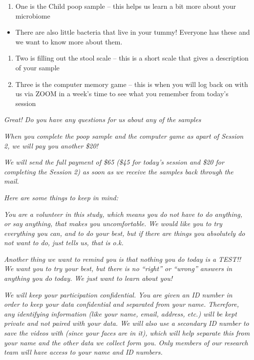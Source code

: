 \documentclass[
]{book}
\providecommand{\tightlist}{%
  \setlength{\itemsep}{0pt}\setlength{\parskip}{0pt}}
\begin{document}
\begin{enumerate}
\def\labelenumi{\arabic{enumi}.}
\tightlist
\item
  One is the Child poop sample -- this helps us learn a bit more about your microbiome
\end{enumerate}

\begin{itemize}
\tightlist
\item
  There are also little bacteria that live in your tummy! Everyone has these and we want to know more about them.
\end{itemize}

\begin{enumerate}
\def\labelenumi{\arabic{enumi}.}
\setcounter{enumi}{1}
\tightlist
\item
  Two is filling out the stool scale -- this is a short scale that gives a description of your sample
\item
  Three is the computer memory game -- this is when you will log back on with us via ZOOM in a week's time to see what you remember from today's session
\end{enumerate}

\emph{Great! Do you have any questions for us about any of the samples}

\emph{When you complete the poop sample and the computer game as apart of Session 2, we will pay you another \$20!}

\emph{We will send the full payment of \$65 (\$45 for today's session and \$20 for completing the Session 2) as soon as we receive the samples back through the mail.}

\emph{Here are some things to keep in mind:}

\emph{You are a volunteer in this study, which means you do not have to do anything, or say anything, that makes you uncomfortable. We would like you to try everything you can, and to do your best, but if there are things you absolutely do not want to do, just tells us, that is o.k.}

\emph{Another thing we want to remind you is that nothing you do today is a TEST!! We want you to try your best, but there is no ``right'' or ``wrong'' answers in anything you do today. We just want to learn about you!}

\emph{We will keep your participation confidential. You are given an ID number in order to keep your data confidential and separated from your name. Therefore, any identifying information (like your name, email, address, etc.) will be kept private and not paired with your data. We will also use a secondary ID number to save the videos with (since your faces are in it), which will help separate this from your name and the other data we collect form you. Only members of our research team will have access to your name and ID numbers.}
\end{document}
